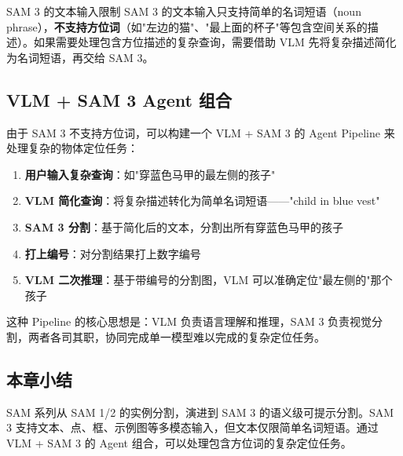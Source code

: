 \begin{warningbox}{SAM 3 的文本输入限制}
SAM 3 的文本输入只支持简单的名词短语（noun phrase），\textbf{不支持方位词}（如"左边的猫"、"最上面的杯子"等包含空间关系的描述）。如果需要处理包含方位描述的复杂查询，需要借助 VLM 先将复杂描述简化为名词短语，再交给 SAM 3。
\end{warningbox}

\subsection{VLM + SAM 3 Agent 组合}

由于 SAM 3 不支持方位词，可以构建一个 VLM + SAM 3 的 Agent Pipeline 来处理复杂的物体定位任务：

\begin{enumerate}
    \item \textbf{用户输入复杂查询}：如"穿蓝色马甲的最左侧的孩子"
    \item \textbf{VLM 简化查询}：将复杂描述转化为简单名词短语——"child in blue vest"
    \item \textbf{SAM 3 分割}：基于简化后的文本，分割出所有穿蓝色马甲的孩子
    \item \textbf{打上编号}：对分割结果打上数字编号
    \item \textbf{VLM 二次推理}：基于带编号的分割图，VLM 可以准确定位"最左侧的"那个孩子
\end{enumerate}

这种 Pipeline 的核心思想是：VLM 负责语言理解和推理，SAM 3 负责视觉分割，两者各司其职，协同完成单一模型难以完成的复杂定位任务。

\subsection{本章小结}

SAM 系列从 SAM 1/2 的实例分割，演进到 SAM 3 的语义级可提示分割。SAM 3 支持文本、点、框、示例图等多模态输入，但文本仅限简单名词短语。通过 VLM + SAM 3 的 Agent 组合，可以处理包含方位词的复杂定位任务。


